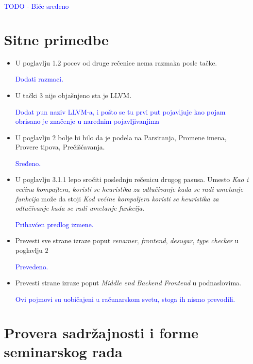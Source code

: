 \documentclass[a4paper]{report}
\newcommand{\odgovor}[1]{\textcolor{blue}{#1}}
\begin{document}
	\odgovor{TODO - Biće sređeno}
	
	
	\section{Sitne primedbe}
	\begin{itemize}
		\item U poglavlju 1.2 pocev od druge rečenice nema razmaka posle tačke.
		
		\odgovor{Dodati razmaci.}
		
		\item U tački 3 nije objašnjeno sta je LLVM.
		
		\odgovor{Dodat pun naziv LLVM-a, i pošto se tu prvi put pojavljuje kao pojam obrisano je značenje u narednim pojavljivanjima}
		
		\item U poglavlju 2 bolje bi bilo da je podela na  Parsiranja, Promene imena, Provere tipova, Prečišćavanja.
		
		\odgovor{Sređeno.}
		
		\item U poglavlju 3.1.1 lepo sročiti poslednju rečenicu drugog pasusa. Umesto \emph{Kao i većina kompajlera, koristi se heuristika za odlučivanje kada se radi umetanje funkcija} može da stoji \emph{Kod većine kompaljera koristi se heuristika za odlučivanje kada se radi umetanje funkcija}.
		
		\odgovor{Prihavćen predlog izmene.}
		
		\item Prevesti sve strane izraze poput \emph{renamer}, \emph{frontend}, \emph{desugar}, \emph{type checker} u poglavlju 2
		
		\odgovor{Prevedeno.}
		
		\item Prevesti strane izraze poput \emph{Middle end} \emph{Backend} \emph{Frontend} u podnaslovima.
		
		\odgovor{Ovi pojmovi su uobičajeni u računarskom svetu, stoga ih nismo prevodili.}
		
	\end{itemize}
	\section{Provera sadržajnosti i forme seminarskog rada}
	
\end{document}
